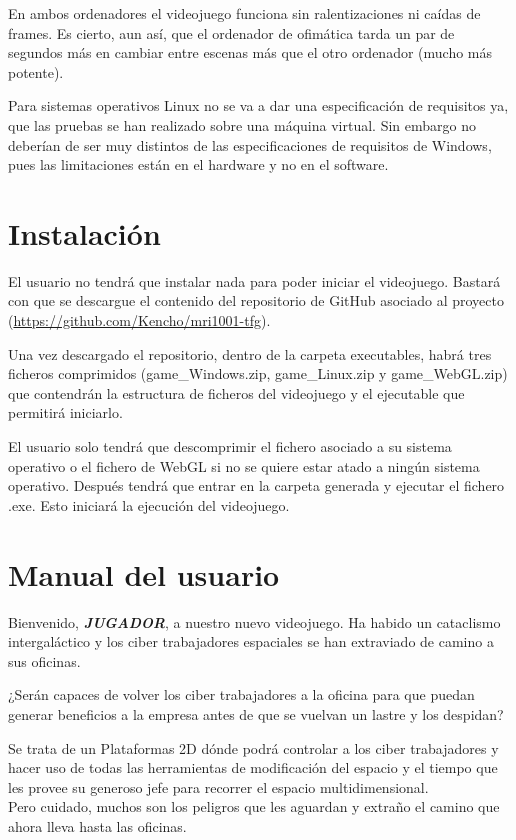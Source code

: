 En ambos ordenadores el videojuego funciona sin ralentizaciones ni caídas de frames. Es cierto, aun así, que el ordenador de ofimática tarda un par de segundos más en cambiar entre escenas más que el otro ordenador (mucho más potente).

Para sistemas operativos Linux no se va a dar una especificación de requisitos ya, que las pruebas se han realizado sobre una máquina virtual. Sin embargo no deberían de ser muy distintos de las especificaciones de requisitos de Windows, pues las limitaciones están en el hardware y no en el software.

\section{Instalación}
El usuario no tendrá que instalar nada para poder iniciar el videojuego. Bastará con que se descargue el contenido del repositorio de GitHub asociado al proyecto (\url{https://github.com/Kencho/mri1001-tfg}).

Una vez descargado el repositorio, dentro de la carpeta executables, habrá tres ficheros comprimidos (game\_Windows.zip, game\_Linux.zip y game\_WebGL.zip) que contendrán la estructura de ficheros del videojuego y el ejecutable que permitirá iniciarlo.

El usuario solo tendrá que descomprimir el fichero asociado a su sistema operativo o el fichero de WebGL si no se quiere estar atado a ningún sistema operativo. Después tendrá que entrar en la carpeta generada y ejecutar el fichero .exe. Esto iniciará la ejecución del videojuego.

\section{Manual del usuario}
Bienvenido, \textit{\textbf{JUGADOR}}, a nuestro nuevo videojuego. Ha habido un \textcolor{endeavour}{cataclismo intergaláctico} y los \textcolor{azulWorker}{ciber trabajadores espaciales} se han extraviado de camino a sus oficinas.


¿Serán capaces de volver los \textcolor{azulWorker}{ciber trabajadores} a la oficina para que puedan generar beneficios a la empresa antes de que se vuelvan un lastre y los despidan?

Se trata de un Plataformas 2D dónde podrá controlar a los \textcolor{azulWorker}{ciber trabajadores} y hacer uso de todas las herramientas de modificación del espacio y el tiempo que les provee su generoso jefe para recorrer el \textcolor{endeavour}{espacio multidimensional}.\\
Pero cuidado, muchos son los peligros que les aguardan y extraño el camino que ahora lleva hasta las oficinas.

